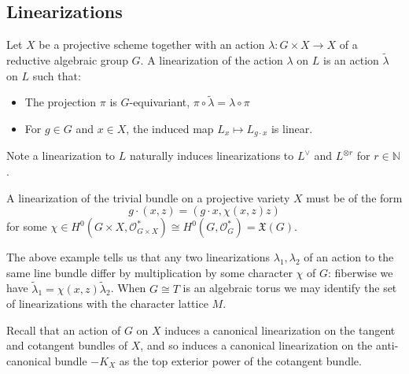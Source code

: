 \subsection{Linearizations} \label{basics:linearizations}
\begin{definition}
 Let \(X\) be a projective scheme together with an action \( \lambda : G \times X \to X\) of a reductive algebraic group \(G\). A linearization of the action \(\lambda\) on \(L\) is an action \(\tilde{\lambda}\) on \(L\) such that:
\begin{itemize}
\item The projection \(\pi\) is \(G\)-equivariant, \(\pi \circ \tilde{\lambda} = \lambda \circ \pi \)
\item For \(g \in G\) and \(x \in X\), the induced map \(L_x \mapsto L_{g \cdot x}\) is linear.
\end{itemize}
\end{definition}
%
%
%
Note a linearization to \(L\) naturally induces linearizations to \(L^\vee\) and \(L^{\otimes r}\) for \(r \in \mathbb{N}\).
%
%
%
\begin{example}
A linearization of the trivial bundle on a projective variety \(X\) must be of the form
\[
g \cdot (x,z) = (g \cdot x, \chi(x,z)z)
\]
for some \(\chi \in H^0(G \times X, \mathcal{O}_{G \times X}^*) \cong H^0(G, \mathcal{O}_G^*) = \mathfrak{X}(G).\)
\end{example}
The above example tells us that any two linearizations \(\lambda_1,\lambda_2\) of an action to the same line bundle differ by multiplication by some character \(\chi\) of \(G\): fiberwise we have \(\tilde{\lambda}_1 = \chi(x,z) \tilde{\lambda}_2\). When \(G \cong T\) is an algebraic torus we may identify the set of linearizations with the character lattice \(M\).
\begin{example}
Recall that an action of \(G\) on \(X\) induces a canonical linearization on the tangent and cotangent bundles of \(X\), and so induces a canonical linearization on the anti-canonical bundle \(-K_X\) as the top exterior power of the cotangent bundle.
\end{example}
